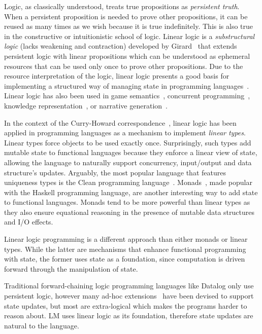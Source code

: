 Logic, as classically understood, treats true propositions as \emph{persistent
truth}. When a persistent proposition is needed to prove other propositions, it
can be reused as many times as we wish because it is true indefinitely. This is
also true in the constructive or intuitionistic school of logic.  Linear logic
is a \emph{substructural logic} (lacks weakening and contraction) developed by
Girard~\cite{Girard95logic:its} that extends persistent logic with linear
propositions which can be understood as ephemeral resources that can be used
only once to prove other propositions.  Due to the resource interpretation of
the logic, linear logic presents a good basis for implementing a structured way
of managing state in programming languages~\cite{Miller85anoverview}. Linear
logic has also been used in game semantics~\cite{lafont1991games,blass1992game},
concurrent programming~\cite{lopez2005monadic,mazurak2010lolliproc,perez-2012},
knowledge representation~\cite{bos2011survey}, or narrative
generation~\cite{chris-int7,martens2013linear}.

In the context of the Curry-Howard correspondence~\cite{howard:tfatnoc}, linear
logic has been applied in programming languages as a mechanism to implement
\emph{linear types}. Linear types force objects to be used
exactly once. Surprisingly, such types add mutable state to functional languages
because they enforce a linear view of state, allowing the language to naturally
support concurrency, input/output and data structure's updates.  Arguably, the
most popular language that features uniqueness types is the Clean programming
language~\cite{JFP:1349748}. Monads~\cite{Wadler:1997:DI:262009.262011}, made
popular with the Haskell programming language, are another interesting way to
add state to functional languages. Monads tend to be more powerful than linear
types as they also ensure equational reasoning in the presence of mutable data
structures and I/O effects.

Linear logic programming is a different approach than either monads or linear
types.  While the latter are mechanisms that enhance functional programming with
state, the former uses state as a foundation, since computation is driven
forward through the manipulation of state.

Traditional forward-chaining logic programming languages like Datalog only use
persistent logic, however many ad-hoc
extensions~\cite{Liu98extendingdatalog,Ludascher95alogical} have been devised to
support state updates, but most are extra-logical which makes the programs
harder to reason about. LM uses linear logic as its foundation, therefore state
updates are natural to the language.

